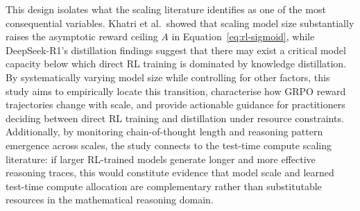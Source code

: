 This design isolates what the scaling literature identifies as one of the most
consequential variables.  Khatri et al.\ showed that scaling model size
substantially raises the asymptotic reward ceiling $A$ in
Equation~\eqref{eq:rl-sigmoid}, while DeepSeek-R1's distillation findings
suggest that there may exist a critical model capacity below which direct RL
training is dominated by knowledge distillation.  By systematically varying
model size while controlling for other factors, this study aims to empirically
locate this transition, characterise how GRPO reward trajectories change with
scale, and provide actionable guidance for practitioners deciding between direct
RL training and distillation under resource constraints.  Additionally, by
monitoring chain-of-thought length and reasoning pattern emergence across
scales, the study connects to the test-time compute scaling literature: if
larger RL-trained models generate longer and more effective reasoning traces,
this would constitute evidence that model scale and learned test-time compute
allocation are complementary rather than substitutable resources in the
mathematical reasoning domain.
